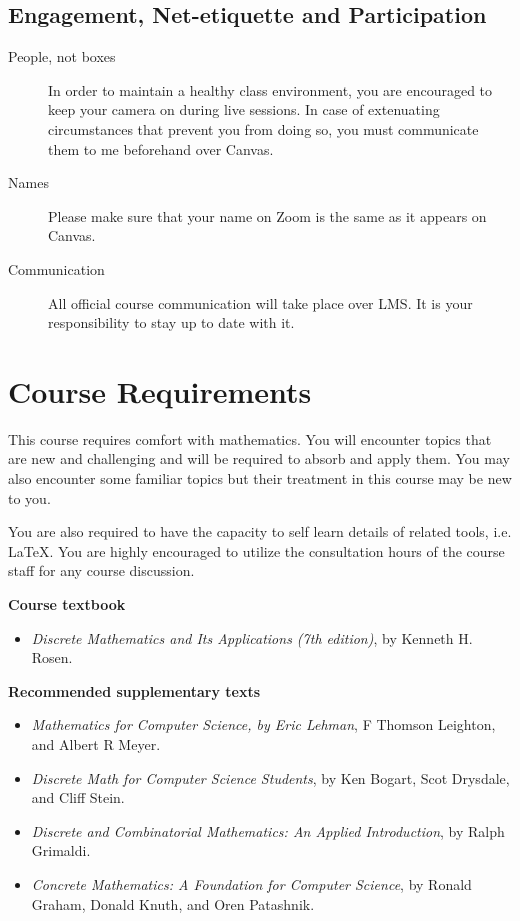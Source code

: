 \documentclass[a4paper]{article}
\begin{document}
\subsection{Engagement, Net-etiquette and Participation}
  \begin{description}
  \item[People, not boxes] In order to maintain a healthy class environment, you are encouraged to keep your camera on during live sessions. In case of extenuating circumstances that prevent you from doing so, you must communicate them to me beforehand over Canvas.
  \item[Names] Please make sure that your name on Zoom is the same as it appears on Canvas.
  \item[Communication] All official course communication will take place over LMS. It is your responsibility to stay up to date with it. 
  \end{description}

\section{Course Requirements}

This course requires comfort with mathematics. You will encounter topics that are new and challenging and will be required to absorb and apply them. You may also encounter some familiar topics but their treatment in this course may be new to you.

You are also required to have the capacity to self learn details of related tools, i.e. \LaTeX. You are highly encouraged to utilize the consultation hours of the course staff for any course discussion.
\medskip

\noindent\textbf{Course textbook}
\begin{itemize}
\item \textit{Discrete Mathematics and Its Applications (7th edition)}, by Kenneth H. Rosen. 
\end{itemize}

\noindent\textbf{Recommended supplementary texts}
\begin{itemize}
\item \textit{Mathematics for Computer Science, by Eric Lehman}, F Thomson Leighton, and Albert R Meyer. 
\item \textit{Discrete Math for Computer Science Students}, by Ken Bogart, Scot Drysdale, and Cliff Stein. 
\item \textit{Discrete and Combinatorial Mathematics: An Applied Introduction}, by Ralph Grimaldi. 
\item \textit{Concrete Mathematics: A Foundation for Computer Science}, by Ronald Graham, Donald Knuth, and Oren Patashnik.
\end{itemize}
\end{document}
